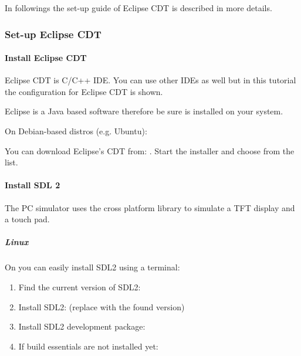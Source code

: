 \documentclass[letterpaper,10pt,english]{sphinxmanual}
\begin{document}
In followings the set-up guide of Eclipse CDT is described in more details.


\subsubsection{Set-up Eclipse CDT}
\label{\detokenize{get-started/pc-simulator:set-up-eclipse-cdt}}

\paragraph{Install Eclipse CDT}
\label{\detokenize{get-started/pc-simulator:install-eclipse-cdt}}
Eclipse CDT is C/C++ IDE. You can use other IDEs as well but in this tutorial the configuration for Eclipse CDT is shown.

Eclipse is a Java based software therefore be sure  is installed on your system.

On Debian-based distros (e.g. Ubuntu): 

You can download Eclipse’s CDT from: . Start the installer and choose  from the list.


\paragraph{Install SDL 2}
\label{\detokenize{get-started/pc-simulator:install-sdl-2}}
The PC simulator uses the  cross platform library to simulate a TFT display and a touch pad.


\subparagraph{Linux}
\label{\detokenize{get-started/pc-simulator:linux}}
On  you can easily install SDL2 using a terminal:
\begin{enumerate}
\item {} 
Find the current version of SDL2: 

\item {} 
Install SDL2:  (replace with the found version)

\item {} 
Install SDL2 development package: 

\item {} 
If build essentials are not installed yet: 

\end{enumerate}
\end{document}
